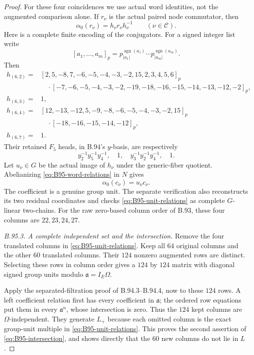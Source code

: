 \begin{proof}
For these four coincidences we use actual word identities, not the
augmented comparison alone. If $r_\nu$ is the actual paired node
commutator, then
\begin{equation}\label{eq:B95-word-relations}
                   \alpha_0(r_\nu)=h_\nu r_\nu h_\nu^{-1}
                   \qquad(\nu\in\mathcal C).
\end{equation}
Here is a complete finite encoding of the conjugators. For a signed
integer list write
\[
 [a_1,\ldots,a_m]_p
       =p_{|a_1|}^{\operatorname{sgn}(a_1)}\cdots
          p_{|a_m|}^{\operatorname{sgn}(a_m)}.
\]
Then
\begin{equation}\label{eq:B95-conjugators}
 \begin{aligned}
 h_{(6,2)}={}&[2,5,-8,7,-6,-5,-4,-3,-2,15,2,3,4,5,6]_p\\
             &\quad\cdot[-7,-6,-5,-4,-3,-2,-19,-18,-16,-15,-14,-13,-12,-2]_p,\\
 h_{(6,3)}={}&1,\\
 h_{(6,4)}={}&[12,-13,-12,5,-9,-8,-6,-5,-4,-3,-2,15]_p\\
             &\quad\cdot[-18,-16,-15,-14,-12]_p,\\
 h_{(6,7)}={}&1.
 \end{aligned}
\end{equation}
Their retained $F_5$ heads, in B.94's $y$-basis, are respectively
\[
 y_2^{-1}y_5^{-1}y_4^{-1},\quad1,\quad
 y_3^{-1}y_2^{-1}y_4^{-1},\quad1.
\]
Let $u_\nu\in G$ be the actual image of $h_\nu$ under the generic-fiber
quotient. Abelianizing \eqref{eq:B95-word-relations} in $N$ gives
\begin{equation}\label{eq:B95-unit-relations}
                    \alpha_0(c_\nu)=u_\nu c_\nu.
\end{equation}
The coefficient is a genuine group unit. The separate verification
also reconstructs its two residual coordinates and checks
\eqref{eq:B95-unit-relations} as complete $G$-linear two-chains.
For the raw zero-based column order of B.93, these four columns are
$22,23,24,27$.

\emph{B.95.3. A complete independent set and the intersection.}
Remove the four translated columns in \eqref{eq:B95-unit-relations}.
Keep all $64$ original columns and the other $60$ translated columns.
Their $124$ nonzero augmented rows are distinct. Selecting these rows
in column order gives a $124$ by $124$ matrix with diagonal signed
group units modulo $\mathfrak a=I_E\Omega$.

Apply the separated-filtration proof of B.94.3--B.94.4, now to these
$124$ rows. A left coefficient relation first has every coefficient
in $\mathfrak a$; the ordered row equations put them in every
$\mathfrak a^n$, whose intersection is zero. Thus the $124$ kept
columns are $\Omega$-independent. They generate $L_+$ because each
omitted column is the exact group-unit multiple in
\eqref{eq:B95-unit-relations}. This proves the second assertion of
\eqref{eq:B95-intersection}, and shows directly that the $60$ new
columns do not lie in $L$.


\end{proof}
